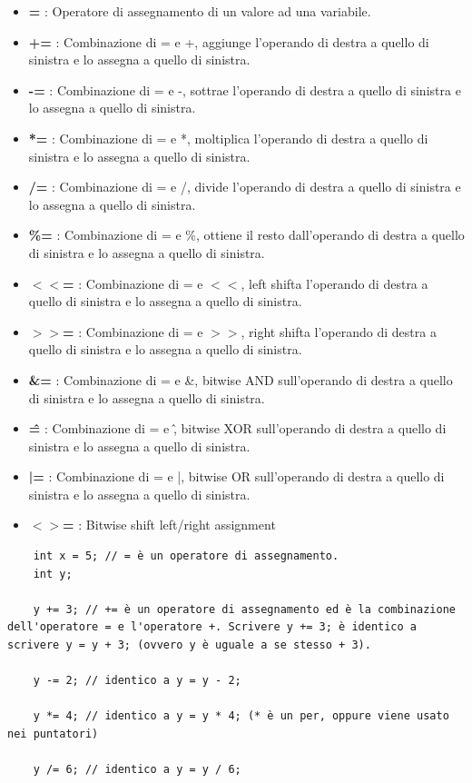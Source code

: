 \begin{itemize}
	\item \textsf{\small \textbf{=} : Operatore di assegnamento di un valore ad una variabile.}
	\item \textsf{\small \textbf{+=} : Combinazione di = e +, aggiunge l'operando di destra a quello di sinistra e lo assegna a quello di sinistra.}
	\item \textsf{\small \textbf{-=} : Combinazione di = e -, sottrae l'operando di destra a quello di sinistra e lo assegna a quello di sinistra.}
	\item \textsf{\small \textbf{*=} : Combinazione di = e *, moltiplica l'operando di destra a quello di sinistra e lo assegna a quello di sinistra.}
	\item \textsf{\small \textbf{/=} : Combinazione di = e /, divide l'operando di destra a quello di sinistra e lo assegna a quello di sinistra.}
	\item \textsf{\small \textbf{\%=} : Combinazione di = e \%, ottiene il resto dall'operando di destra a quello di sinistra e lo assegna a quello di sinistra.}
	\item \textsf{\small \textbf{$<<$=} : Combinazione di = e $<<$, left shifta l'operando di destra a quello di sinistra e lo assegna a quello di sinistra.}
	\item \textsf{\small \textbf{$>>$=} : Combinazione di = e $>>$, right shifta l'operando di destra a quello di sinistra e lo assegna a quello di sinistra.}
	\item \textsf{\small \textbf{\&=} : Combinazione di = e \&, bitwise AND sull'operando di destra a quello di sinistra e lo assegna a quello di sinistra.}
	\item \textsf{\small \textbf{\^ =} : Combinazione di = e \^, bitwise XOR sull'operando di destra a quello di sinistra e lo assegna a quello di sinistra.}
	\item \textsf{\small \textbf{|=} : Combinazione di = e |, bitwise OR sull'operando di destra a quello di sinistra e lo assegna a quello di sinistra.}
	\item \textsf{\small \textbf{$<>$=} : Bitwise shift left/right assignment} 
\end{itemize}

\begin{lstlisting}
	int x = 5; // = è un operatore di assegnamento.
	int y;
	
	y += 3; // += è un operatore di assegnamento ed è la combinazione dell'operatore = e l'operatore +. Scrivere y += 3; è identico a scrivere y = y + 3; (ovvero y è uguale a se stesso + 3).
	
	y -= 2; // identico a y = y - 2;
	
	y *= 4; // identico a y = y * 4; (* è un per, oppure viene usato nei puntatori)
	
	y /= 6; // identico a y = y / 6;
	
\end{lstlisting}

